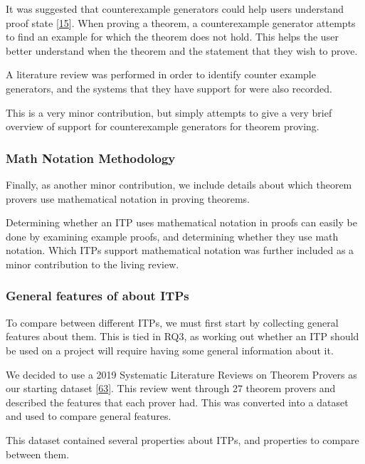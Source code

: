 \documentclass[
]{article}
\begin{document}
It was suggested that counterexample generators could help users
understand proof state
{[}\protect\hyperlink{ref-beckert_usability_2015}{15}{]}. When proving a
theorem, a counterexample generator attempts to find an example for
which the theorem does not hold. This helps the user better understand
when the theorem and the statement that they wish to prove.

A literature review was performed in order to identify counter example
generators, and the systems that they have support for were also
recorded.

This is a very minor contribution, but simply attempts to give a very
brief overview of support for counterexample generators for theorem
proving.

\hypertarget{sec:math_notation_meth}{%
\subsubsection{Math Notation Methodology}\label{sec:math_notation_meth}}

Finally, as another minor contribution, we include details about which
theorem provers use mathematical notation in proving theorems.

Determining whether an ITP uses mathematical notation in proofs can
easily be done by examining example proofs, and determining whether they
use math notation. Which ITPs support mathematical notation was further
included as a minor contribution to the living review.

\hypertarget{general-features-of-about-itps}{%
\subsubsection{General features of about
ITPs}\label{general-features-of-about-itps}}

To compare between different ITPs, we must first start by collecting
general features about them. This is tied in RQ3, as working out whether
an ITP should be used on a project will require having some general
information about it.

We decided to use a 2019 Systematic Literature Reviews on Theorem
Provers as our starting dataset
{[}\protect\hyperlink{ref-nawaz_survey_2019}{63}{]}. This review went
through 27 theorem provers and described the features that each prover
had. This was converted into a dataset and used to compare general
features.

This dataset contained several properties about ITPs, and properties to
compare between them.
\end{document}

